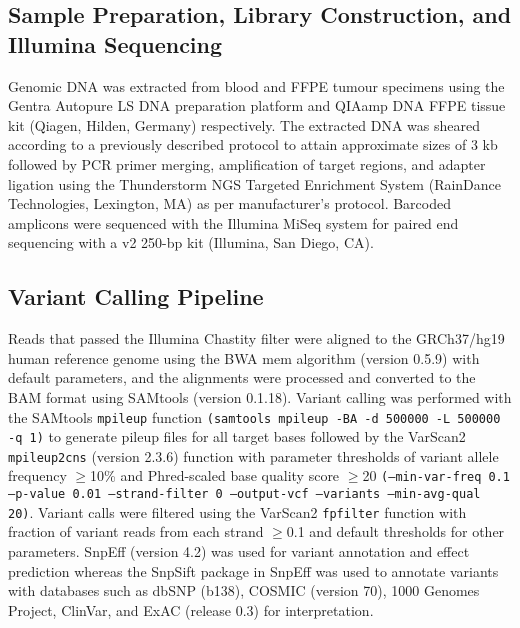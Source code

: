 \subsection{Sample Preparation, Library Construction, and Illumina Sequencing}

Genomic DNA was extracted from blood and FFPE tumour specimens using the Gentra Autopure LS DNA preparation platform and QIAamp DNA FFPE tissue kit (Qiagen, Hilden, Germany) respectively. The extracted DNA was sheared according to a previously described protocol \cite{Bosdet2013} to attain approximate sizes of 3 kb followed by PCR primer merging, amplification of target regions, and adapter ligation using the Thunderstorm NGS Targeted Enrichment System (RainDance Technologies, Lexington, MA) as per manufacturer's protocol. Barcoded amplicons were sequenced with the Illumina MiSeq system for paired end sequencing with a v2 250-bp kit (Illumina, San Diego, CA).

\subsection{Variant Calling Pipeline}

Reads that passed the Illumina Chastity filter were aligned to the GRCh37/hg19 human reference genome using the BWA mem algorithm (version 0.5.9) with default parameters, and the alignments were processed and converted to the BAM format using SAMtools (version 0.1.18). Variant calling was performed with the SAMtools \texttt{mpileup} function \texttt{(samtools mpileup -BA -d 500000 -L 500000 -q 1)} to generate pileup files for all target bases followed by the VarScan2 \texttt{mpileup2cns} (version 2.3.6) function with parameter thresholds of variant allele frequency $\geq$10\% and Phred-scaled base quality score $\geq$20 \texttt{(--min-var-freq 0.1 --p-value 0.01 --strand-filter 0 --output-vcf --variants --min-avg-qual 20)}. Variant calls were filtered using the VarScan2 \texttt{fpfilter} function with fraction of variant reads from each strand $\geq$0.1 and default thresholds for other parameters. SnpEff (version 4.2) was used for variant annotation and effect prediction whereas the SnpSift package in SnpEff was used to annotate variants with databases such as dbSNP (b138), COSMIC (version 70), 1000 Genomes Project, ClinVar, and ExAC (release 0.3) for interpretation.

